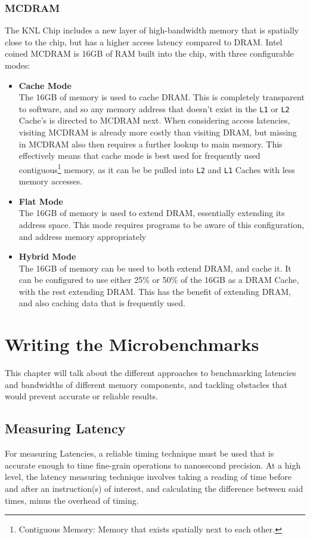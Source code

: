 \documentclass[bsc,frontabs,twoside,singlespacing,parskip,deptreport]{infthesis}     %
\begin{document}
\subsection{MCDRAM}
The KNL Chip includes a new layer of high-bandwidth memory that is spatially close to the chip, but has a higher access latency compared to DRAM. Intel coined MCDRAM is 16GB of RAM built into the chip, with three configurable modes:

\begin{itemize}
    \item \textbf{Cache Mode} \\
    The 16GB of memory is used to cache DRAM. This is completely transparent to software, and so any memory address that doesn't exist in the \texttt{L1} or \texttt{L2} Cache's is directed to MCDRAM next. When considering access latencies, visiting MCDRAM is already more costly than visiting DRAM, but missing in MCDRAM also then requires a further lookup to main memory. This effectively means that cache mode is best used for frequently used contiguous\footnote{Contiguous Memory: Memory that exists spatially next to each other.} memory, as it can be be pulled into \texttt{L2} and \texttt{L1} Caches with less memory accesses.
    
    \item \textbf{Flat Mode} \\
    The 16GB of memory is used to extend DRAM, essentially extending its address space. This mode requires programs to be aware of this configuration, and address memory appropriately
    
    \item \textbf{Hybrid Mode} \\
    The 16GB of memory can be used to both extend DRAM, and cache it. It can be configured to use either 25\% or 50\% of the 16GB as a DRAM Cache, with the rest extending DRAM. This has the benefit of extending DRAM, and also caching data that is frequently used.
\end{itemize}

\chapter{Writing the Microbenchmarks}
This chapter will talk about the different approaches to benchmarking latencies and bandwidths of different memory components, and tackling obstacles that would prevent accurate or reliable results.

\section{Measuring Latency}\label{measuring-latency}
For measuring Latencies, a reliable timing technique must be used that is accurate enough to time fine-grain operations to nanosecond precision. At a high level, the latency measuring technique involves taking a reading of time before and after an instruction(s) of interest, and calculating the difference between said times, minus the overhead of timing.
\end{document}
